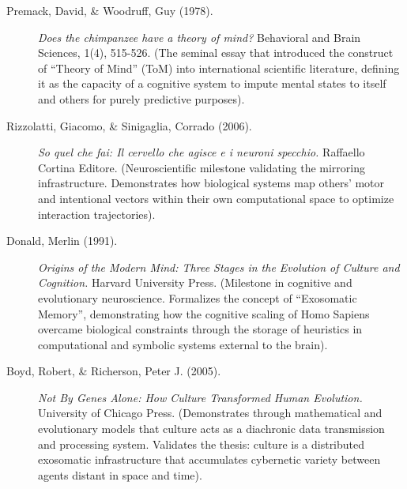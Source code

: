 \documentclass[11pt,a4paper,oneside]{article} %
\begin{document}
\begin{description}
\item[Premack, David, \& Woodruff, Guy (1978).] \emph{Does the chimpanzee have a theory of mind?} Behavioral and Brain Sciences, 1(4), 515-526. (The seminal essay that introduced the construct of ``Theory of Mind'' (ToM) into international scientific literature, defining it as the capacity of a cognitive system to impute mental states to itself and others for purely predictive purposes).

\item[Rizzolatti, Giacomo, \& Sinigaglia, Corrado (2006).] \emph{So quel che fai: Il cervello che agisce e i neuroni specchio.} Raffaello Cortina Editore. (Neuroscientific milestone validating the mirroring infrastructure. Demonstrates how biological systems map others' motor and intentional vectors within their own computational space to optimize interaction trajectories).
\end{description}

\hypertarget{a1.8-the-exosomatic-level-and-cultural-infrastructure-as-external-memory}{%
\label{a1.8-the-exosomatic-level-and-cultural-infrastructure-as-external-memory}}

\begin{description}
\item[Donald, Merlin (1991).] \emph{Origins of the Modern Mind: Three Stages in the Evolution of Culture and Cognition.} Harvard University Press. (Milestone in cognitive and evolutionary neuroscience. Formalizes the concept of ``Exosomatic Memory'', demonstrating how the cognitive scaling of Homo Sapiens overcame biological constraints through the storage of heuristics in computational and symbolic systems external to the brain).

\item[Boyd, Robert, \& Richerson, Peter J. (2005).] \emph{Not By Genes Alone: How Culture Transformed Human Evolution.} University of Chicago Press. (Demonstrates through mathematical and evolutionary models that culture acts as a diachronic data transmission and processing system. Validates the thesis: culture is a distributed exosomatic infrastructure that accumulates cybernetic variety between agents distant in space and time).
\end{description}

\hypertarget{a1.9-endogenous-emergence-of-ethical-codes}{%
\label{a1.9-endogenous-emergence-of-ethical-codes}}
\end{document}
